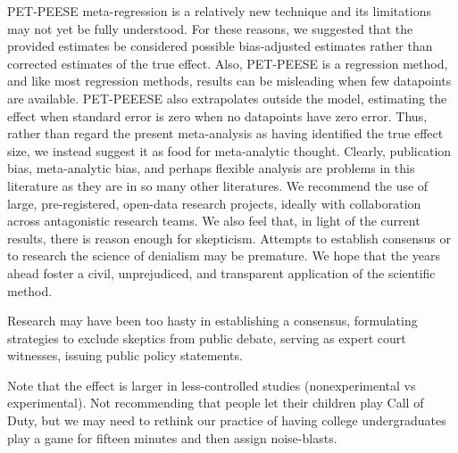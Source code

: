 PET-PEESE meta-regression is a relatively new technique and its limitations may not yet be fully understood. For these reasons, we suggested that the provided estimates be considered possible bias-adjusted estimates rather than corrected estimates of the true effect. Also, PET-PEESE is a regression method, and like most regression methods, results can be misleading when few datapoints are available. PET-PEEESE also extrapolates outside the model, estimating the effect when standard error is zero when no datapoints have zero error. Thus, rather than regard the present meta-analysis as having identified the true effect size, we instead suggest it as food for meta-analytic thought. Clearly, publication bias, meta-analytic bias, and perhaps flexible analysis are problems in this literature as they are in so many other literatures. We recommend the use of large, pre-registered, open-data research projects, ideally with collaboration across antagonistic research teams. We also feel that, in light of the current results, there is reason enough for skepticism. Attempts to establish consensus or to research the science of denialism may be premature. We hope that the years ahead foster a civil, unprejudiced, and transparent application of the scientific method. 

Research may have been too hasty in establishing a consensus, formulating strategies to exclude skeptics from public debate, serving as expert court witnesses, issuing public policy statements.

Note that the effect is larger in less-controlled studies (nonexperimental vs experimental).
Not recommending that people let their children play Call of Duty, but we may need to rethink our practice of having college undergraduates play a game for fifteen minutes and then assign noise-blasts.